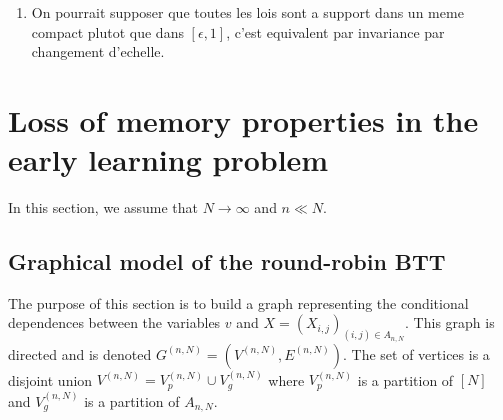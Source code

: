 \begin{enumerate}
\item On pourrait supposer que toutes les lois sont a support dans un meme compact plutot que dans $[\epsilon,1]$, c'est equivalent par invariance par changement d'echelle.
\end{enumerate}

\section{Loss of memory properties in the early learning problem}

In this section, we assume that $N\to\infty$ and $n\ll N$.

\subsection{Graphical model of the round-robin BTT}
The purpose of this section is to build a graph representing the conditional dependences between the variables $v$ and $X=(X_{i,j})_{(i,j)\in A_{n,N}}$. This graph is directed and is denoted $G^{(n,N)}=(V^{(n,N)},E^{(n,N)})$. The set of vertices is a disjoint union $V^{(n,N)}=V^{(n,N)}_{p}\cup V^{(n,N)}_g$ where $V^{(n,N)}_p$ is a partition of $[N]$ and $V^{(n,N)}_g$ is a partition of $ A_{n,N}$. 

